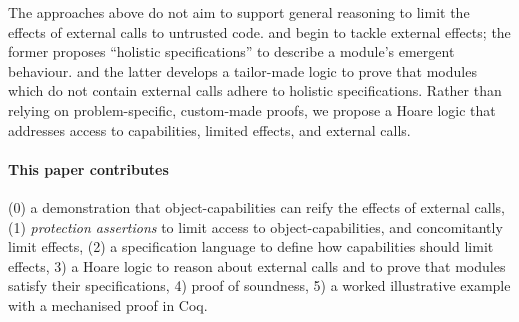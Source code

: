 The approaches above %
do not aim to support
general reasoning to limit the effects of external calls to untrusted code.
\citet{FASE} and \citet{OOPSLA22} begin to tackle external effects; %
the former proposes  ``holistic specifications'' to describe a module's emergent behaviour. 
and the latter develops 
a tailor-made logic to prove that modules which do not contain external calls adhere to holistic specifications.
%
%
Rather than relying on problem-specific, custom-made proofs, we propose a Hoare logic that addresses access to capabilities, limited effects, and external calls.

\paragraph{This paper contributes}
(0) a demonstration that object-capabilities can reify the effects of external calls,
{(1) \emph{protection assertions} to limit access to object-capabilities, and concomitantly limit effects}, 
(2) a specification language to define how capabilities should limit effects, %
3) a Hoare logic to reason about external calls and to prove that modules satisfy their %
specifications,
4) proof of soundness,
5) a worked illustrative example {with a mechanised proof in Coq}.
 

